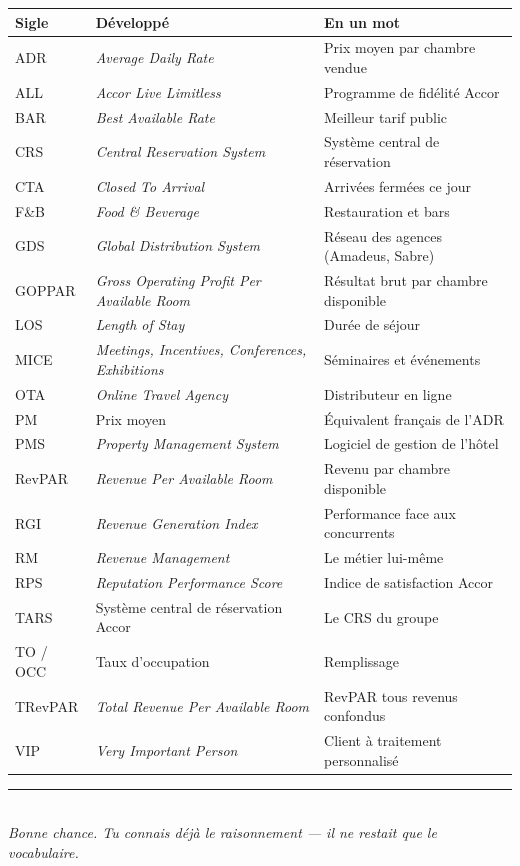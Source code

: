 \documentclass[11pt,a4paper]{article}
\begin{document}
\begin{center}
\footnotesize
\renewcommand{\arraystretch}{1.05}
\begin{tabularx}{\textwidth}{@{}L{1.9cm} L{5.4cm} X@{}}
\toprule
{}\textbf{Sigle} & \textbf{Développé} & \textbf{En un mot} \\
\midrule
ADR & \emph{Average Daily Rate} & Prix moyen par chambre vendue \\
ALL & \emph{Accor Live Limitless} & Programme de fidélité Accor \\
BAR & \emph{Best Available Rate} & Meilleur tarif public \\
CRS & \emph{Central Reservation System} & Système central de réservation \\
CTA & \emph{Closed To Arrival} & Arrivées fermées ce jour \\
F\&B & \emph{Food \& Beverage} & Restauration et bars \\
GDS & \emph{Global Distribution System} & Réseau des agences (Amadeus, Sabre) \\
GOPPAR & \emph{Gross Operating Profit Per Available Room} & Résultat brut par chambre disponible \\
LOS & \emph{Length of Stay} & Durée de séjour \\
MICE & \emph{Meetings, Incentives, Conferences, Exhibitions} & Séminaires et événements \\
OTA & \emph{Online Travel Agency} & Distributeur en ligne \\
PM & Prix moyen & Équivalent français de l'ADR \\
PMS & \emph{Property Management System} & Logiciel de gestion de l'hôtel \\
RevPAR & \emph{Revenue Per Available Room} & Revenu par chambre disponible \\
RGI & \emph{Revenue Generation Index} & Performance face aux concurrents \\
RM & \emph{Revenue Management} & Le métier lui-même \\
RPS & \emph{Reputation Performance Score} & Indice de satisfaction Accor \\
TARS & Système central de réservation Accor & Le CRS du groupe \\
TO / OCC & Taux d'occupation & Remplissage \\
TRevPAR & \emph{Total Revenue Per Available Room} & RevPAR tous revenus confondus \\
VIP & \emph{Very Important Person} & Client à traitement personnalisé \\
\bottomrule
\end{tabularx}
\end{center}

\vspace{0.6em}
\begin{center}
{\color{orsof}\rule{0.35\textwidth}{0.8pt}}\\[5pt]
{\footnotesize\itshape\color{grisfonce} Bonne chance. Tu connais déjà le raisonnement --- il ne restait que le vocabulaire.}
\end{center}
\end{document}
